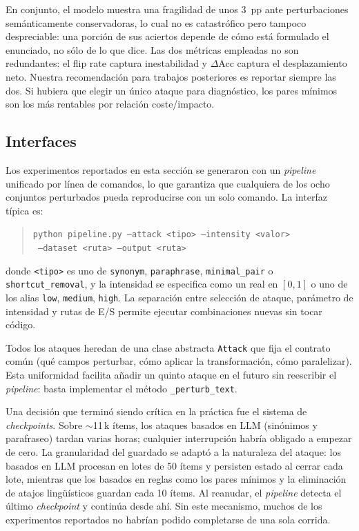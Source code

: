 \documentclass[11pt]{article}
\begin{document}
En conjunto, el modelo muestra una fragilidad de unos $3$~pp ante
perturbaciones semánticamente conservadoras, lo cual no es catastrófico
pero tampoco despreciable: una porción de sus aciertos depende de cómo
está formulado el enunciado, no sólo de lo que dice. Las dos métricas
empleadas no son redundantes: el flip rate captura inestabilidad y
$\Delta$Acc captura el desplazamiento neto. Nuestra recomendación
para trabajos posteriores es reportar siempre las dos. Si hubiera que
elegir un único ataque para diagnóstico, los pares mínimos son los
más rentables por relación coste/impacto.

\subsection{Interfaces}
\label{sec:interfaces}

Los experimentos reportados en esta sección se generaron con un
\textit{pipeline} unificado por línea de comandos, lo que garantiza
que cualquiera de los ocho conjuntos perturbados pueda reproducirse
con un solo comando. La interfaz típica es:

\begin{quote}
\small
\texttt{python pipeline.py --attack <tipo> --intensity <valor>}\\
\texttt{\phantom{python pipeline.py} --dataset <ruta> --output <ruta>}
\end{quote}

\noindent donde \texttt{<tipo>} es uno de \texttt{synonym},
\texttt{paraphrase}, \texttt{minimal\_pair} o \texttt{shortcut\_removal},
y la intensidad se especifica como un real en $[0, 1]$ o uno de los
alias \texttt{low}, \texttt{medium}, \texttt{high}. La separación entre
selección de ataque, parámetro de intensidad y rutas de E/S permite
ejecutar combinaciones nuevas sin tocar código.

Todos los ataques heredan de una clase abstracta \texttt{Attack} que
fija el contrato común (qué campos perturbar, cómo aplicar la
transformación, cómo paralelizar). Esta uniformidad facilita añadir un
quinto ataque en el futuro sin reescribir el \textit{pipeline}: basta
implementar el método \texttt{\_perturb\_text}.

Una decisión que terminó siendo crítica en la práctica fue el
sistema de \textit{checkpoints}. Sobre $\sim$11\,k ítems, los ataques
basados en LLM (sinónimos y parafraseo) tardan varias horas; cualquier
interrupción habría obligado a empezar de cero. La granularidad del
guardado se adaptó a la naturaleza del ataque: los basados en LLM
procesan en lotes de 50 ítems y persisten estado al cerrar cada lote,
mientras que los basados en reglas como los pares mínimos y la
eliminación de atajos lingüísticos guardan cada 10 ítems. Al reanudar,
el \textit{pipeline} detecta el último \textit{checkpoint} y continúa
desde ahí. Sin este mecanismo, muchos de los experimentos reportados
no habrían podido completarse de una sola corrida.
\end{document}
